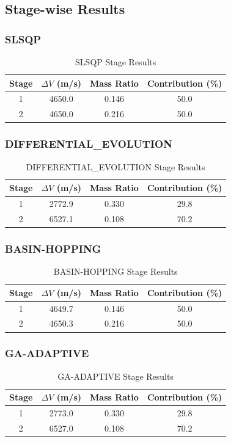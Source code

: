 \documentclass{article}
\begin{document}
\subsection{Stage-wise Results}

\subsubsection{SLSQP}
\begin{table}[H]
\centering
\caption{SLSQP Stage Results}
\begin{tabular}{cccc}
\toprule
Stage & $\Delta V$ (m/s) & Mass Ratio & Contribution (\%) \\
\midrule
1 & 4650.0 & 0.146 & 50.0 \\
2 & 4650.0 & 0.216 & 50.0 \\
\bottomrule
\end{tabular}
\end{table}

\subsubsection{DIFFERENTIAL_EVOLUTION}
\begin{table}[H]
\centering
\caption{DIFFERENTIAL_EVOLUTION Stage Results}
\begin{tabular}{cccc}
\toprule
Stage & $\Delta V$ (m/s) & Mass Ratio & Contribution (\%) \\
\midrule
1 & 2772.9 & 0.330 & 29.8 \\
2 & 6527.1 & 0.108 & 70.2 \\
\bottomrule
\end{tabular}
\end{table}

\subsubsection{BASIN-HOPPING}
\begin{table}[H]
\centering
\caption{BASIN-HOPPING Stage Results}
\begin{tabular}{cccc}
\toprule
Stage & $\Delta V$ (m/s) & Mass Ratio & Contribution (\%) \\
\midrule
1 & 4649.7 & 0.146 & 50.0 \\
2 & 4650.3 & 0.216 & 50.0 \\
\bottomrule
\end{tabular}
\end{table}

\subsubsection{GA-ADAPTIVE}
\begin{table}[H]
\centering
\caption{GA-ADAPTIVE Stage Results}
\begin{tabular}{cccc}
\toprule
Stage & $\Delta V$ (m/s) & Mass Ratio & Contribution (\%) \\
\midrule
1 & 2773.0 & 0.330 & 29.8 \\
2 & 6527.0 & 0.108 & 70.2 \\
\bottomrule
\end{tabular}
\end{table}
\end{document}
